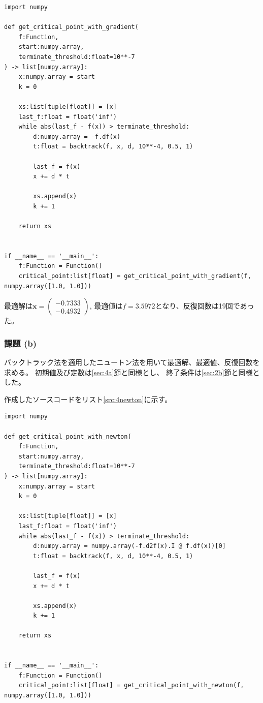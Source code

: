 \documentclass[a4j, titlepage]{jsarticle}
\numberwithin{equation}{section}
\begin{document}
            \begin{lstlisting}[caption=最急降下法の実装, label=src:4saikyu]
import numpy

def get_critical_point_with_gradient(
    f:Function,
    start:numpy.array,
    terminate_threshold:float=10**-7
) -> list[numpy.array]:
    x:numpy.array = start
    k = 0
    
    xs:list[tuple[float]] = [x]
    last_f:float = float('inf')
    while abs(last_f - f(x)) > terminate_threshold:
        d:numpy.array = -f.df(x)
        t:float = backtrack(f, x, d, 10**-4, 0.5, 1)
        
        last_f = f(x)
        x += d * t
        
        xs.append(x)
        k += 1
    
    return xs


if __name__ == '__main__':
    f:Function = Function()
    critical_point:list[float] = get_critical_point_with_gradient(f, numpy.array([1.0, 1.0]))
            \end{lstlisting}

            最適解は$\bm{x}=\begin{pmatrix}
                -0.7333 \\
                -0.4932
            \end{pmatrix}$, 最適値は$f=3.5972$となり、反復回数は19回であった。

        \subsubsection{課題 (b)}
            バックトラック法を適用したニュートン法を用いて最適解、最適値、反復回数を求める。
            初期値及び定数は\ref{sec:4a}節と同様とし、
            終了条件は\ref{sec:2b}節と同様とした。

            作成したソースコードをリスト\ref{src:4newton}に示す。

            \begin{lstlisting}[caption=ニュートン法の実装, label=src:4newton]
import numpy
            
def get_critical_point_with_newton(
    f:Function,
    start:numpy.array,
    terminate_threshold:float=10**-7
) -> list[numpy.array]:
    x:numpy.array = start
    k = 0
    
    xs:list[tuple[float]] = [x]
    last_f:float = float('inf')
    while abs(last_f - f(x)) > terminate_threshold:
        d:numpy.array = numpy.array(-f.d2f(x).I @ f.df(x))[0]
        t:float = backtrack(f, x, d, 10**-4, 0.5, 1)
        
        last_f = f(x)
        x += d * t
        
        xs.append(x)
        k += 1
    
    return xs


if __name__ == '__main__':
    f:Function = Function()
    critical_point:list[float] = get_critical_point_with_newton(f, numpy.array([1.0, 1.0]))
            \end{lstlisting}
\end{document}
